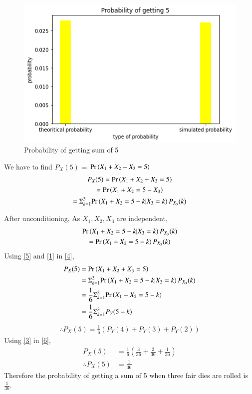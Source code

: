 \documentclass[journal,12pt,twocolumn]{IEEEtran}
\begin{document}
\begin{figure}[htp]
    \centering
    \includegraphics[width=\columnwidth]{assign3.png}
    \caption{Probability of getting sum of 5}
\end{figure}
We have to find $P_X(5)$ = $\Pr\left(X_1+X_2+X_3=5\right)$
\begin{multline}
    P_X(5)=\Pr\left(X_1+X_2+X_3=5\right)\\
   =\Pr\left(X_1+X_2=5-X_3\right)\\
    =\Sigma_{k=1}^{3}{\Pr\left(X_1+X_2=5-k|X_3=k\right)P_{X_3}(k)}\label{4}
\end{multline}

After unconditioning, As $X_1,X_2,X_3$ are independent,
\begin{multline}
    {\ensuremath{\Pr\left(X_1+X_2=5-k|X_3=k\right)}P_{X_3}(k)}\\={\Pr\left(X_1+X_2=5-k\right)P_{X_3}(k)}\label{5}
\end{multline}
Using \eqref{5} and \eqref{1} in \eqref{4},
\begin{align*}
    P_X(5)&=\Pr\left(X_1+X_2+X_3=5\right)\\
    &=\Sigma_{k=1}^{3}{\Pr\left(X_1+X_2=5-k|X_3=k\right)P_{X_3}(k)}\\
     &=\frac{1}{6}\Sigma_{k=1}^{3}{\Pr\left(X_1+X_2=5-k\right)}\\
     &=\frac{1}{6}\Sigma_{k=1}^{3}{P_Y{(5-k)}}
\end{align*}
\begin{align}
   \therefore P_X(5) =\frac{1}{6}(P_Y(4)+P_Y(3)+P_Y(2))\label{6}
\end{align}
Using \eqref{3} in \eqref{6},
\begin{align}
    P_X(5)&=\frac{1}{6}(\frac{3}{36}+\frac{2}{36}+\frac{1}{36})\\
    \therefore P_X(5)&=\frac{1}{36}
\end{align}
Therefore the probability of getting a sum of 5 when three fair dies are rolled is $\frac{1}{36}$.
\end{document}
